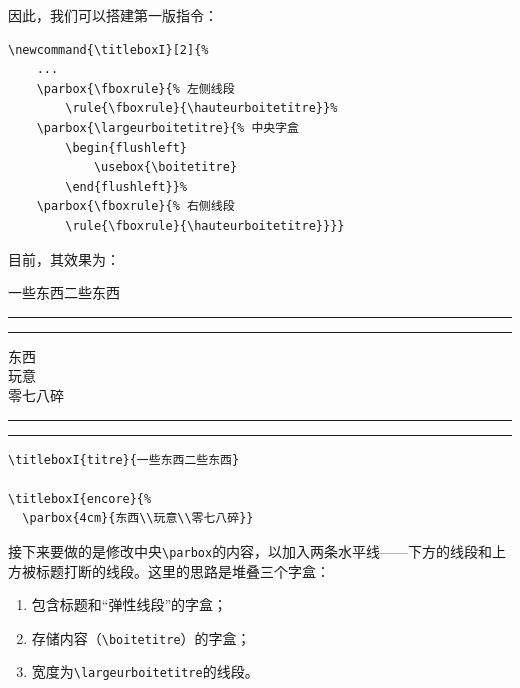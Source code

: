 因此，我们可以搭建第一版指令：

\begin{dmd}
\begin{verbatim}
\newcommand{\titleboxI}[2]{% 
    ...
    \parbox{\fboxrule}{% 左侧线段
        \rule{\fboxrule}{\hauteurboitetitre}}%
    \parbox{\largeurboitetitre}{% 中央字盒
        \begin{flushleft}
            \usebox{\boitetitre} 
        \end{flushleft}}%
    \parbox{\fboxrule}{% 右侧线段
        \rule{\fboxrule}{\hauteurboitetitre}}}}
\end{verbatim}
\end{dmd}

\newcommand{\titleboxI}[2]{%
  \begin{lrbox}{\boitetitre}%
    \kern\fboxsep#2\kern\fboxsep
  \end{lrbox}
  \settowidth{\largeurboitetitre}{\usebox{\boitetitre}}%
  \settoheight{\hauteurboitetitre}{\usebox{\boitetitre}}%
  \settodepth{\tempdim}{\usebox{\boitetitre}}%
  \addtolength{\hauteurboitetitre}{\tempdim+2\fboxrule+2\fboxsep}%
  \parbox{\fboxrule}{%
    \rule{\fboxrule}{\hauteurboitetitre}}%
  \parbox{\largeurboitetitre}{%
    \begin{flushleft}
      \usebox{\boitetitre}
    \end{flushleft}}%
  \parbox{\fboxrule}{%
    \rule{\fboxrule}{\hauteurboitetitre}}}

目前，其效果为：

\begin{codelist}[10.19]{
    \titleboxI{titre}{一些东西二些东西}

\titleboxI{encore}{%
  \parbox{4cm}{东西\\玩意\\零七八碎}}
}\begin{verbatim}
\titleboxI{titre}{一些东西二些东西}

\titleboxI{encore}{%
  \parbox{4cm}{东西\\玩意\\零七八碎}}
\end{verbatim}
\end{codelist}

接下来要做的是修改中央\verb|\parbox|的内容，以加入两条水平线——下方的线段和上方被标题打断的线段。这里的思路是堆叠三个字盒：

\begin{enumerate}
    \item 包含标题和“弹性线段”的字盒；
    \item 存储内容（\verb|\boitetitre|）的字盒；
    \item 宽度为\verb|\largeurboitetitre|的线段。
\end{enumerate}

